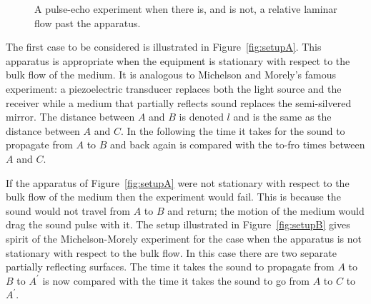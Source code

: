 \documentclass[10pt, fleqn,final,showtrims,oldfontcommands, article,a4paper,oneside]{memoir} %
\newcommand{\figref}[1]{Figure~\ref{fig:#1}}
\begin{document}


 \begin{figure}[t]
      \centering
\hspace{2cm}
\label{fig:setups}
      \caption{A pulse-echo experiment when there is, and is not, a relative laminar flow past the apparatus.}
 \end{figure}
The first case to be considered is illustrated in \figref{setupA}.
This apparatus is appropriate when the equipment is stationary with respect to the bulk flow of the medium.
It is  analogous to  Michelson and Morely's famous experiment:
a piezoelectric transducer  replaces both the light source and the receiver while a medium that partially reflects sound  replaces the semi-silvered mirror.
The distance between $A$ and $B$ is denoted $l$ and is the same  as the distance between $A$ and $C$.
In the following the time it takes for the sound to propagate from $A$ to $B$ and back again is compared with the to-fro times between $A$ and $C$.


If the apparatus of \figref{setupA} were not stationary with respect to the bulk flow of the medium then the experiment would fail.
This is because the sound would not travel from  $A$ to $B$ and return;
the motion of the medium would drag the sound pulse with it.
The setup illustrated in \figref{setupB} gives spirit of the Michelson-Morely experiment for the case when the apparatus is not stationary with respect to the bulk flow.
In this case there are two separate partially reflecting surfaces.
The time it takes the sound to propagate from $A$ to $B$ to $A^\prime$ is now compared with the time it takes the sound 
to go from $A$ to $C$ to $A^\prime$.
\end{document}

